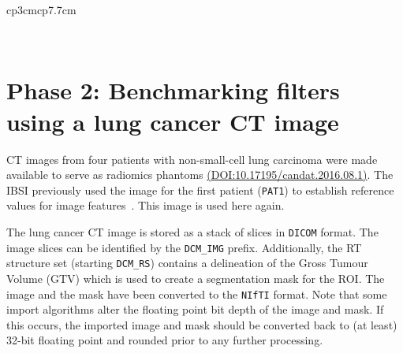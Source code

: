 \documentclass[fleqn,a4paper,oneside,openany]{book}
\begin{document}
\begin{longtable}{cp{3cm}cp{7.7cm}}
\begin{minipage}[t]{\linewidth}
\begin{itemize}[nosep,after=\strut,leftmargin=*]
    \end{itemize}
    \end{minipage} \\     
    \bottomrule
    \caption{\normalsize Filters, parameters and phantoms for comparing and standardising filter implementations. \textit{Note that 2\(D\) and 3\(D\) rotation invariance for Laws and undecimated wavelet filters (Daubechies 2, Coiflet 1, Haar) is estimated using equivariant right angle rotational representation for separable filters (Appendix \ref{app:separableConvRightAngleEquivariant}). Pooling refers to pooling over response maps obtained under different orientations. 2\(D\) filters are applied in the axial plane by default, except for Gabor filters. For Gabor filters, 2$D$ rotation invariance is estimated by rotating the the filter kernel over multiple orientations in the image plane.}} \label{tab:benchmark_filter_settings}
\end{longtable}
\normalsize
%
\FloatBarrier
%
%
\section{Phase 2: Benchmarking filters using a lung cancer CT image}\label{sec:featureBenchmarkLungCT}
%
CT images from four patients with non-small-cell lung carcinoma were made available to serve as radiomics phantoms \href{http://dx.doi.org/10.17195/candat.2016.08.1}{(DOI:10.17195/candat.2016.08.1)}. The IBSI previously used the image for the first patient (\texttt{PAT1}) to establish reference values for image features~\cite{ZLV2017}. This image is used here again.

The lung cancer CT image is stored as a stack of slices in \texttt{DICOM} format. The image slices can be identified by the \texttt{DCM\_IMG} prefix. Additionally, the RT structure set (starting \texttt{DCM\_RS}) contains a delineation of the Gross Tumour Volume (GTV) which is used to create a segmentation mask for the ROI. The image and the mask have been converted to the \texttt{NIfTI} format. Note that some import algorithms alter the floating point bit depth of the image and mask. If this occurs, the imported image and mask should be converted back to (at least) 32-bit floating point and rounded prior to any further processing.
\end{document}
